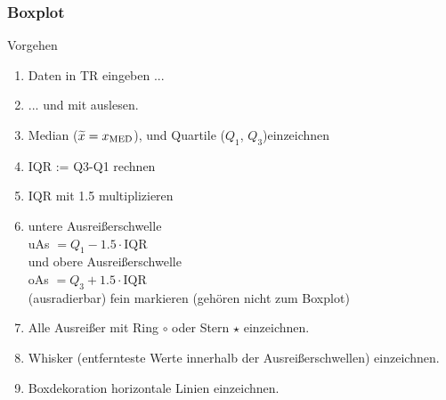 \begin{multicols}{2}
\subsubsection*{Boxplot}
Vorgehen
\begin{enumerate}
\item Daten in TR eingeben ...
\item ... und mit   auslesen.
\item {\color{orange} Median ($\widetilde{x} = x_{\textrm{MED}}$)},
und Quartile ({\color{blue}$Q_1$}, {\color{green}$Q_3$})einzeichnen
\item IQR := {\color{green}Q3}-{\color{blue}Q1} rechnen
\item IQR mit 1.5 multiplizieren
\item {\color{red} untere Ausreißerschwelle\\ uAs} $ = Q_1 -
1.5\cdot{}\textrm{IQR}$\\ und {\color{red} obere Ausreißerschwelle\\ oAs} $=Q_3 + 1.5\cdot{}\textrm{IQR}$\\ (ausradierbar) fein markieren (gehören nicht zum Boxplot)
\item Alle Ausreißer mit Ring $\circ$ oder Stern $\star$ einzeichnen.
\item Whisker (entfernteste Werte innerhalb der Ausreißerschwellen)
einzeichnen.
\item Boxdekoration horizontale Linien einzeichnen.
\end{enumerate}

\end{multicols}
